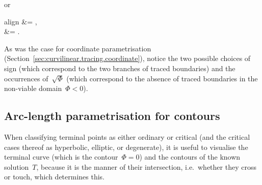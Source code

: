 or
\begin{important}{align}
   &= ,
    \label{eq:tracing-ode-arc-length-parametrisation-u} \\[\fraclinespace]
   &= .
    \label{eq:tracing-ode-arc-length-parametrisation-v}
\end{important}
As was the case for coordinate parametrisation
(Section~\ref{sec:curvilinear.tracing.coordinate}),
notice the two possible choices of sign
(which correspond to the two branches of traced boundaries)
and the occurrences of~$\sqrt{\Phi}$
(which correspond to the absence of traced boundaries
in the non-viable domain~$\Phi < 0$).

\subsection{Arc-length parametrisation for contours}
\label{sec:curvilinear.tracing.arc-length-contours}

When classifying terminal points as either ordinary or critical
(and the critical cases thereof as hyperbolic, elliptic, or degenerate),
it is useful to visualise the terminal curve (which is the contour~$\Phi = 0$)
and the contours of the known solution~$T$,
because it is the manner of their intersection,
i.e.~whether they cross or touch,
which determines this.

